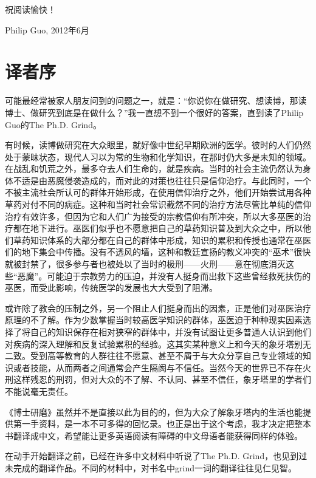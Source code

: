 \documentclass[12pt,UTF8,nofonts]{book}
\newcommand{\bookname}{博士研磨}
\begin{document}
祝阅读愉快！

\begin{flushright}
Philip Guo, 2012年6月
\end{flushright}

\chapter*{译者序}
\markboth{}{}


可能最经常被家人朋友问到的问题之一，就是：“你说你在做研究、想读博，那读博士、做研究到底是在做什么？”我一直想不到一个很好的答案，直到读了Philip Guo的The Ph.D. Grind。

有时候，读博做研究在大众眼里，就好像中世纪早期欧洲的医学。彼时的人们仍然处于蒙昧状态，现代人习以为常的生物和化学知识，在那时仍大多是未知的领域。在战乱和饥荒之外，最多夺去人们生命的，就是疾病。当时的社会主流仍然认为身体不适是由恶魔侵袭造成的，而对此的对策也往往只是信仰治疗。与此同时，一个不被主流社会所认可的群体开始形成，在使用信仰治疗之外，他们开始尝试用各种草药对付不同的病症。这种和当时社会常识截然不同的治疗方法尽管比单纯的信仰治疗有效许多，但因为它和人们广为接受的宗教信仰有所冲突，所以大多巫医的治疗都在地下进行。巫医们似乎也不愿意把自己的草药知识普及到大众之中，所以他们草药知识体系的大部分都在自己的群体中形成，知识的累积和传授也通常在巫医们的地下集会中传播。没有不透风的墙，这种和教廷宣扬的教义冲突的“巫术”很快就被封禁了，很多参与者也被处以了当时的极刑——火刑——意在彻底消灭这些“恶魔”。可能迫于宗教势力的压迫，并没有人挺身而出救下这些曾经救死扶伤的巫医，而受此影响，传统医学的发展也大大受到了阻滞。

或许除了教会的压制之外，另一个阻止人们挺身而出的因素，正是他们对巫医治疗原理的不了解。作为少数掌握当时较高医学知识的群体，巫医迫于种种现实因素选择了将自己的知识保存在相对狭窄的群体中，并没有试图让更多普通人认识到他们对疾病的深入理解和反复试验累积的经验。这其实某种意义上和今天的象牙塔别无二致。受到高等教育的人群往往不愿意、甚至不屑于与大众分享自己专业领域的知识或者技能，从而两者之间通常会产生隔阂与不信任。当然今天的世界已不存在火刑这样残忍的刑罚，但对大众的不了解、不认同、甚至不信任，象牙塔里的学者们不能说毫无责任。

《\bookname》虽然并不是直接以此为目的的，但为大众了解象牙塔内的生活也能提供第一手资料，是一本不可多得的回忆录。也正是出于这个考虑，我才决定把整本书翻译成中文，希望能让更多英语阅读有障碍的中文母语者能获得同样的体验。


在动手开始翻译之前，已经在许多中文材料中听说了The Ph.D. Grind，也见到过未完成的翻译作品。不同的材料中，对书名中grind一词的翻译往往见仁见智。
\end{document}
